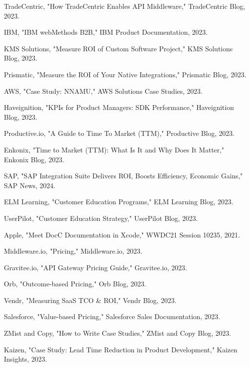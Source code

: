 \documentclass[11pt,a4paper]{article}
\begin{document}
\begin{thebibliography}{99}

 TradeCentric, "How TradeCentric Enables API Middleware," TradeCentric Blog, 2023.

 IBM, "IBM webMethods B2B," IBM Product Documentation, 2023.

 KMS Solutions, "Measure ROI of Custom Software Project," KMS Solutions Blog, 2023.

 Prismatic, "Measure the ROI of Your Native Integrations," Prismatic Blog, 2023.

 AWS, "Case Study: NNAMU," AWS Solutions Case Studies, 2023.

 Haveignition, "KPIs for Product Managers: SDK Performance," Haveignition Blog, 2023.

 Productive.io, "A Guide to Time To Market (TTM)," Productive Blog, 2023.

 Enkonix, "Time to Market (TTM): What Is It and Why Does It Matter," Enkonix Blog, 2023.

 SAP, "SAP Integration Suite Delivers ROI, Boosts Efficiency, Economic Gains," SAP News, 2024.

 ELM Learning, "Customer Education Programs," ELM Learning Blog, 2023.

 UserPilot, "Customer Education Strategy," UserPilot Blog, 2023.

 Apple, "Meet DocC Documentation in Xcode," WWDC21 Session 10235, 2021.

 Middleware.io, "Pricing," Middleware.io, 2023.

 Gravitee.io, "API Gateway Pricing Guide," Gravitee.io, 2023.

 Orb, "Outcome-based Pricing," Orb Blog, 2023.

 Vendr, "Measuring SaaS TCO \& ROI," Vendr Blog, 2023.

 Salesforce, "Value-based Pricing," Salesforce Sales Documentation, 2023.

 ZMist and Copy, "How to Write Case Studies," ZMist and Copy Blog, 2023.

 Kaizen, "Case Study: Lead Time Reduction in Product Development," Kaizen Insights, 2023.


\end{thebibliography}
\end{document}
